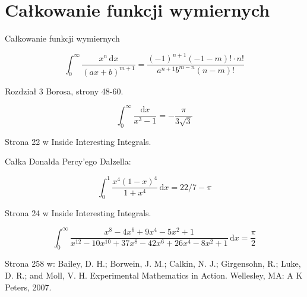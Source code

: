 %

\section{Całkowanie funkcji wymiernych}
Całkowanie funkcji wymiernych

\begin{problem}
\begin{equation}
    \int_0^\infty \frac{x^n \,\mathrm{d}x}{(ax+b)^{m+1}}  = \frac{(-1)^{n+1} (-1-m)! \cdot n!}{a^{n+1} b^{m-n} (n-m)!}
\end{equation}
\end{problem}

\begin{solution}
    Rozdział 3 Borosa, strony 48-60.
\end{solution}

\begin{problem}
\begin{equation}
    \int_0^\infty \frac{\mathrm{d}x}{x^3 - 1} = - \frac{\pi}{3\sqrt{3}}
\end{equation}
\end{problem}

\begin{solution}
    Strona 22 w Inside Interesting Integrals.
\end{solution}


Całka Donalda Percy'ego Dalzella:
\begin{problem}
\begin{equation}
    \int_0^1 \frac{x^4(1-x)^4}{1 + x^4} \,\mathrm{d}x = 22/7 - \pi
\end{equation}
\end{problem}

\begin{solution}
    Strona 24 w Inside Interesting Integrals.
\end{solution}


\begin{problem}
\begin{equation}
    \int_0^\infty \frac{x^8-4x^6+9x^4-5x^2+1}{x^{12}-10x^{10}+37x^8-42x^6+26x^4-8x^2+1} \,\mathrm{d}x = \frac{\pi}{2}
\end{equation}
\end{problem}

\begin{solution}
    Strona 258 w: Bailey, D. H.; Borwein, J. M.; Calkin, N. J.; Girgensohn, R.; Luke, D. R.; and Moll, V. H. Experimental Mathematics in Action. Wellesley, MA: A K Peters, 2007.
\end{solution}

%